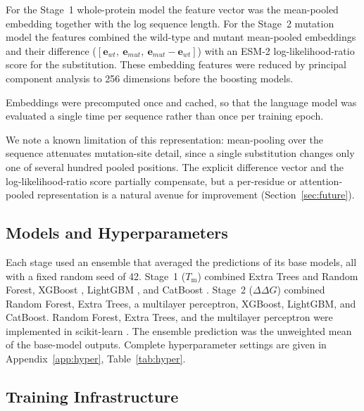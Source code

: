 \documentclass[journal,article,submit,moreauthors]{Definitions/mdpi}
\newcommand{\ddg}{\ensuremath{\Delta\Delta G}}
\newcommand{\Tm}{\ensuremath{T_\mathrm{m}}}
\begin{document}
For the Stage~1 whole-protein model the feature vector was the mean-pooled embedding
together with the log sequence length. For the Stage~2 mutation model the features combined
the wild-type and mutant mean-pooled embeddings and their difference
($[\mathbf{e}_{wt},\ \mathbf{e}_{mut},\ \mathbf{e}_{mut}-\mathbf{e}_{wt}]$) with an ESM-2
log-likelihood-ratio score for the substitution. These embedding features were reduced by
principal component analysis to 256 dimensions before the boosting models.

Embeddings were precomputed once and cached, so that the language model was evaluated a
single time per sequence rather than once per training epoch.

We note a known limitation of this representation: mean-pooling over the sequence
attenuates mutation-site detail, since a single substitution changes only one of several
hundred pooled positions. The explicit difference vector and the log-likelihood-ratio score
partially compensate, but a per-residue or attention-pooled representation is a natural
avenue for improvement (Section~\ref{sec:future}).

\subsection{Models and Hyperparameters}

Each stage used an ensemble that averaged the predictions of its base models, all with a
fixed random seed of 42. Stage~1 (\Tm) combined Extra Trees and Random Forest, XGBoost
\citep{chen2016xgboost}, LightGBM \citep{ke2017lightgbm}, and CatBoost
\citep{prokhorenkova2018catboost}. Stage~2 (\ddg) combined Random Forest, Extra Trees, a
multilayer perceptron, XGBoost, LightGBM, and CatBoost. Random Forest, Extra Trees, and the
multilayer perceptron were implemented in scikit-learn \citep{pedregosa2011sklearn}. The
ensemble prediction was the unweighted mean of the base-model outputs. Complete
hyperparameter settings are given in Appendix~\ref{app:hyper}, Table~\ref{tab:hyper}.

\subsection{Training Infrastructure}
\end{document}
